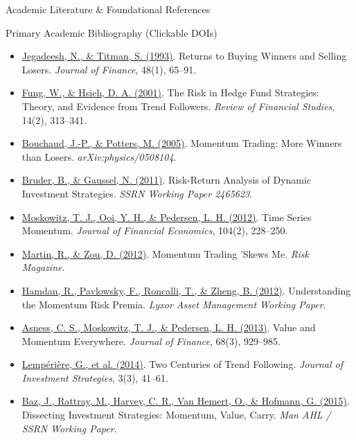 \documentclass[10pt]{beamer}
\begin{document}
\begin{frame}{Academic Literature \& Foundational References}
  \begin{block}{\tiny Primary Academic Bibliography (Clickable DOIs)}
    \begin{itemize}\tiny
      \item \href{https://doi.org/10.1111/j.1540-6261.1993.tb04702.x}{Jegadeesh, N., \& Titman, S. (1993)}. Returns to Buying Winners and Selling Losers. \emph{Journal of Finance}, 48(1), 65--91.
      \item \href{https://people.duke.edu/~dah7/RFS2001.pdf}{Fung, W., \& Hsieh, D. A. (2001)}. The Risk in Hedge Fund Strategies: Theory, and Evidence from Trend Followers. \emph{Review of Financial Studies}, 14(2), 313--341.
      \item \href{https://arxiv.org/abs/physics/0508104}{Bouchaud, J.-P., \& Potters, M. (2005)}. Momentum Trading: More Winners than Losers. \emph{arXiv:physics/0508104}.
      \item \href{https://ssrn.com/abstract=2465623}{Bruder, B., \& Gaussel, N. (2011)}. Risk-Return Analysis of Dynamic Investment Strategies. \emph{SSRN Working Paper 2465623}.
      \item \href{https://doi.org/10.1016/j.jfineco.2011.11.003}{Moskowitz, T. J., Ooi, Y. H., \& Pedersen, L. H. (2012)}. Time Series Momentum. \emph{Journal of Financial Economics}, 104(2), 228--250.
      \item \href{https://www.risk.net/derivatives/structured-products/2194247/momentum-trading-skews-me}{Martin, R., \& Zou, D. (2012)}. Momentum Trading 'Skews Me. \emph{Risk Magazine}.
      \item \href{http://www.thierry-roncalli.com/download/Alternative_Risk_Premia.pdf}{Hamdan, R., Pavlowsky, F., Roncalli, T., \& Zheng, B. (2012)}. Understanding the Momentum Risk Premia. \emph{Lyxor Asset Management Working Paper}.
      \item \href{https://doi.org/10.1111/jofi.12021}{Asness, C. S., Moskowitz, T. J., \& Pedersen, L. H. (2013)}. Value and Momentum Everywhere. \emph{Journal of Finance}, 68(3), 929--985.
      \item \href{https://arxiv.org/abs/1404.7797}{Lemp{\'e}ri{\`e}re, G., et al. (2014)}. Two Centuries of Trend Following. \emph{Journal of Investment Strategies}, 3(3), 41--61.
      \item \href{https://ssrn.com/abstract=2695101}{Baz, J., Rattray, M., Harvey, C. R., Van Hemert, O., \& Hofmann, G. (2015)}. Dissecting Investment Strategies: Momentum, Value, Carry. \emph{Man AHL / SSRN Working Paper}.

\end{itemize}
\end{block}
\end{frame}
\end{document}
